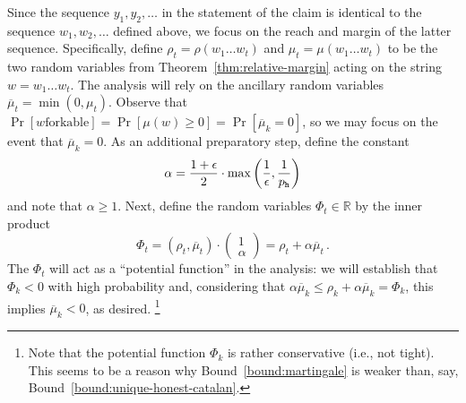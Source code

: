 Since the sequence $y_1, y_2, \ldots$ in the statement of the claim 
is identical to the sequence $w_1, w_2, \ldots$ defined above, 
we focus on the reach and margin of the latter sequence. 
Specifically, define $\rho_t = \rho(w_1 \ldots w_t)$ and
$\mu_t = \mu(w_1 \ldots w_t)$ to be the two random variables from
Theorem~\ref{thm:relative-margin} acting on the string $w=w_1 \ldots w_t$. The
analysis will rely on the ancillary random variables
$\overline{\mu}_t = \min(0,\mu_t)$.  Observe that $\Pr[\text{$w$
  forkable}] = \Pr[\mu(w) \geq 0] = \Pr[\overline{\mu}_k = 0]$, so we
may focus on the event that $\overline{\mu}_k = 0$. As an additional
preparatory step, define the constant
\begin{equation}\label{eq:martingale-alpha}  
  \alpha = \frac{1+\epsilon}{2} \cdot \max\left( \frac{1}{\epsilon}, \frac{1}{p_{\mathtt{h}}} \right)
\end{equation}
and note that $\alpha \geq 1$. 
Next, define the random
variables $\Phi_t \in \mathbb{R}$ by the inner product
  \[
    \Phi_t = (\rho_t, \overline{\mu}_t) \cdot
    \left(\begin{array}{c} 1\\ \alpha\end{array}\right) = \rho_t +
    \alpha \overline{\mu}_t\,.
  \]
  The $\Phi_t$ will act as a ``potential function'' in the analysis:
  we will establish that $\Phi_k < 0$ with high probability and,
  considering that
  $\alpha\overline{\mu}_k \leq \rho_k + \alpha \overline{\mu}_k =
  \Phi_k$, this implies $\overline{\mu}_k < 0$, as desired. \footnote{
    Note that the potential function $\Phi_k$ is rather conservative (i.e., not tight). 
    This seems to be a reason why Bound~\ref{bound:martingale} 
    is weaker than, say, Bound~\ref{bound:unique-honest-catalan}.
  }



